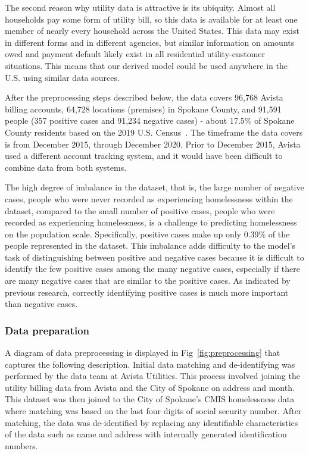 \documentclass[10pt,letterpaper]{article}
\begin{document}
The second reason why utility data is attractive is its ubiquity. Almost all households pay some form of utility bill, so this data is available for at least one member of nearly every household across the United States. This data may exist in different forms and in different agencies, but similar information on amounts owed and payment default likely exist in all residential utility-customer situations. This means that our derived model could be used anywhere in the U.S. using similar data sources.

After the preprocessing steps described below, the data covers 96,768 Avista billing accounts, 64,728 locations (premises) in Spokane County, and 91,591 people (357 positive cases and 91,234 negative cases) - about 17.5\% of Spokane County residents based on the 2019 U.S. Census~\cite{SpokanePop}. The timeframe the data covers is from December 2015, through December 2020. Prior to December 2015, Avista used a different account tracking system, and it would have been difficult to combine data from both systems. 

The high degree of imbalance in the dataset, that is, the large number of negative cases, people who were never recorded as experiencing homelessness within the dataset, compared to the small number of positive cases, people who were recorded as experiencing homelessness, is a challenge to predicting homelessness on the population scale. Specifically, positive cases make up only 0.39\% of the people represented in the dataset. This imbalance adds difficulty to the model's task of distinguishing between positive and negative cases because it is difficult to identify the few positive cases among the many negative cases, especially if there are many negative cases that are similar to the positive cases. As indicated by previous research, correctly identifying positive cases is much more important than negative cases.

\subsubsection*{Data preparation}
A diagram of data preprocessing is displayed in Fig~\ref{fig:preprocessing} that captures the following description. Initial data matching and de-identifying was performed by the data team at Avista Utilities. This process involved joining the utility billing data from Avista and the City of Spokane on address and month. This dataset was then joined to the City of Spokane's CMIS homelessness data where matching was based on the last four digits of social security number. After matching, the data was de-identified by replacing any identifiable characteristics of the data such as name and address with internally generated identification numbers.
\end{document}

